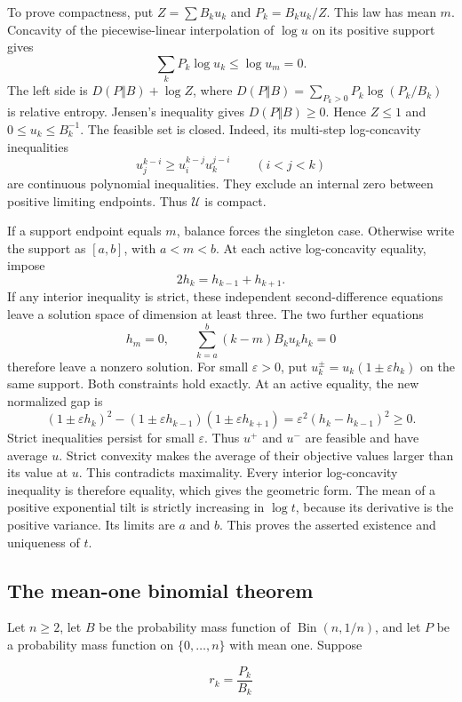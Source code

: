 \documentclass[11pt,a4paper]{article}
\theoremstyle{definition}
\theoremstyle{remark}
\begin{document}
To prove compactness, put \(Z=\sum B_ku_k\) and \(P_k=B_ku_k/Z\). This
law has mean \(m\). Concavity of the piecewise-linear interpolation of
\(\log u\) on its positive support gives \[
 \sum_k P_k\log u_k\le\log u_m=0.
\] The left side is \(D(P\Vert B)+\log Z\), where
\(D(P\Vert B)=\sum_{P_k>0}P_k\log(P_k/B_k)\) is relative entropy.
Jensen's inequality gives \(D(P\Vert B)\ge0\). Hence \(Z\le1\) and
\(0\le u_k\le B_k^{-1}\). The feasible set is closed. Indeed, its
multi-step log-concavity inequalities \[
 u_j^{k-i}\ge u_i^{k-j}u_k^{j-i}\qquad(i<j<k)
\] are continuous polynomial inequalities. They exclude an internal zero
between positive limiting endpoints. Thus \(\mathcal U\) is compact.

If a support endpoint equals \(m\), balance forces the singleton case.
Otherwise write the support as \([a,b]\), with \(a<m<b\). At each active
log-concavity equality, impose \[
 2h_k=h_{k-1}+h_{k+1}.
\] If any interior inequality is strict, these independent
second-difference equations leave a solution space of dimension at least
three. The two further equations \[
 h_m=0,\qquad\sum_{k=a}^b(k-m)B_ku_kh_k=0
\] therefore leave a nonzero solution. For small \(\varepsilon>0\), put
\(u_k^\pm=u_k(1\pm\varepsilon h_k)\) on the same support. Both
constraints hold exactly. At an active equality, the new normalized gap
is \[
 (1\pm\varepsilon h_k)^2-(1\pm\varepsilon h_{k-1})(1\pm\varepsilon h_{k+1})
 =\varepsilon^2(h_k-h_{k-1})^2\ge0.
\] Strict inequalities persist for small \(\varepsilon\). Thus \(u^+\)
and \(u^-\) are feasible and have average \(u\). Strict convexity makes
the average of their objective values larger than its value at \(u\).
This contradicts maximality. Every interior log-concavity inequality is
therefore equality, which gives the geometric form. The mean of a
positive exponential tilt is strictly increasing in \(\log t\), because
its derivative is the positive variance. Its limits are \(a\) and \(b\).
This proves the asserted existence and uniqueness of \(t\).

\subsection{The mean-one binomial
theorem}\label{scalar-the-mean-one-binomial-theorem}

Let \(n\ge2\), let \(B\) be the probability mass function of
\(\operatorname{Bin}(n,1/n)\), and let \(P\) be a probability mass
function on \(\{0,\ldots,n\}\) with mean one. Suppose

\[
r_k=\frac{P_k}{B_k}
\]
\end{document}
